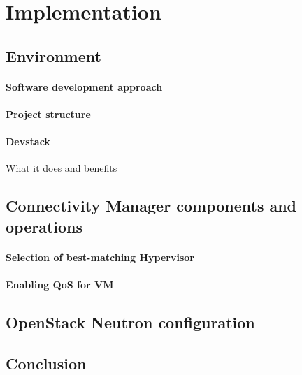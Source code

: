 \chapter{Implementation}

\section{Environment}

\subsubsection{Software development approach}

\subsubsection{Project structure}

\subsubsection{Devstack}

What it does and benefits

\section{Connectivity Manager components and operations}

\subsubsection{Selection of best-matching Hypervisor}

\subsubsection{Enabling QoS for VM}

\section{OpenStack Neutron configuration}

\section{Conclusion}